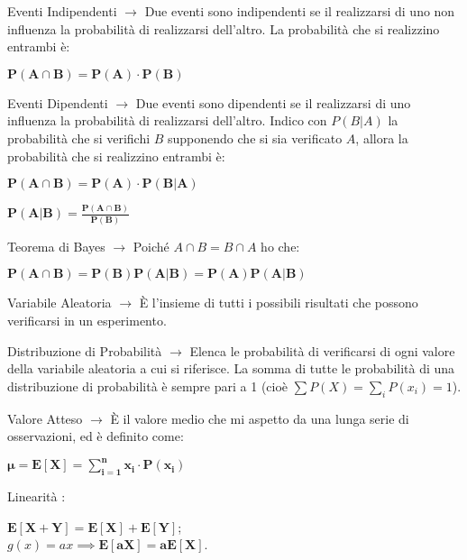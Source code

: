 \documentclass[8pt]{extarticle}
\begin{document}
\begin{formulario}
\begin{descr}{1}
\item[Eventi Indipendenti]$\rightarrow$ Due eventi sono indipendenti se il realizzarsi di uno non influenza la probabilità di realizzarsi dell'altro. La probabilità che si realizzino entrambi è:
		\begin{tcenter}
$\bm{P(A\cap B)=P(A)\cdot P(B)}$
		\end{tcenter}
		
\item[Eventi Dipendenti]$\rightarrow$ Due eventi sono dipendenti se il realizzarsi di uno influenza la probabilità di realizzarsi dell'altro.  Indico con $P(B|A)$ la probabilità che si verifichi $B$ supponendo che si sia verificato $A$, allora la probabilità che si realizzino entrambi è:
		\begin{tcenter}
$\bm{P(A\cap B)= P(A)\cdot P(B|A)}$
		\end{tcenter}
		
	\end{descr}
		\begin{tcenter}
$\bm{P(A|B)=\frac{P(A\cap B)}{P(B)}}$
		\end{tcenter}
		
		\begin{descr}{1}
\item[Teorema di Bayes] $\rightarrow$ Poiché $A\cap B=B\cap A$ ho che:
			\begin{tcenter}
$\bm{P(A\cap B)=P(B)P(A|B)=P(A)P(A|B)}$
			\end{tcenter}
		\end{descr}

	\begin{descr}{0}
\item[Variabile Aleatoria] $\rightarrow$ È l'insieme di tutti i possibili risultati che possono verificarsi in un esperimento.
\item[Distribuzione di Probabilità] $\rightarrow$ Elenca le probabilità di verificarsi di ogni valore della variabile aleatoria a cui si riferisce. La somma di tutte le probabilità di una distribuzione di probabilità è sempre pari a 1 (cioè $\sum P(X)=\sum_i P(x_i)=1$).
\item[Valore Atteso] $\rightarrow$ È il valore medio che mi aspetto da una lunga serie di osservazioni, ed è definito come: 
		\begin{tcenter}
$\bm{\mu=E[X]=\sum_{i=1}^n x_i\cdot P(x_i)}$
		\end{tcenter}
		\begin{descr}{0}
\item[Linearità]:
		\begin{tcenter}
$\bm{E[X+Y]=E[X]+E[Y]}$;\\
$g(x)=ax \implies \bm{E[aX]=aE[X]}$.
		\end{tcenter}
		\end{descr}
	\end{descr}
\myRule


\end{formulario}
\end{document}
